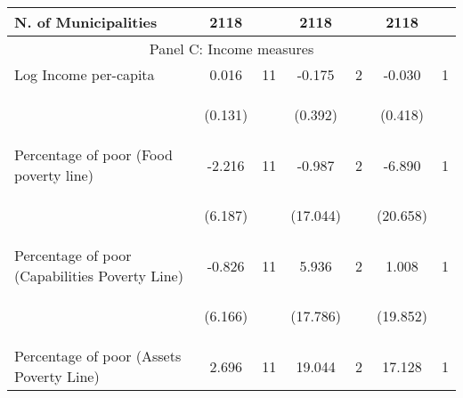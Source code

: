 \begin{tabular}{lcccccc}
N. of Municipalities  &   2118   &  &  2118    & &  2118  &    \\

\hline		

\multicolumn{7}{c}{Panel C: Income measures} \\

Log Income per-capita    &  0.016   &  11  &   -0.175  &  2 &  -0.030  &  1   \\

\vspace{4pt} &  \begin{footnotesize}(0.131)\end{footnotesize}   & &
			    \begin{footnotesize}(0.392)\end{footnotesize}   & &
			    \begin{footnotesize}(0.418)\end{footnotesize}   &
			     \\          


Percentage of poor (Food poverty line)     &  -2.216   &  11  &   -0.987  &  2 &  -6.890  &  1   \\

\vspace{4pt} &  \begin{footnotesize}(6.187)\end{footnotesize}   & &
			    \begin{footnotesize}(17.044)\end{footnotesize}   & &
			    \begin{footnotesize}(20.658)\end{footnotesize}   &
			     \\


Percentage of poor (Capabilities Poverty Line)     &  -0.826   &  11  &   5.936  &  2 &  1.008  &  1   \\

\vspace{4pt} &  \begin{footnotesize}(6.166)\end{footnotesize}   & &
			    \begin{footnotesize}(17.786)\end{footnotesize}   & &
			    \begin{footnotesize}(19.852)\end{footnotesize}   &
			     \\
 
Percentage of poor (Assets Poverty Line)    &  2.696   &  11  &   19.044  &  2 &  17.128  &  1   \\


\end{tabular}
